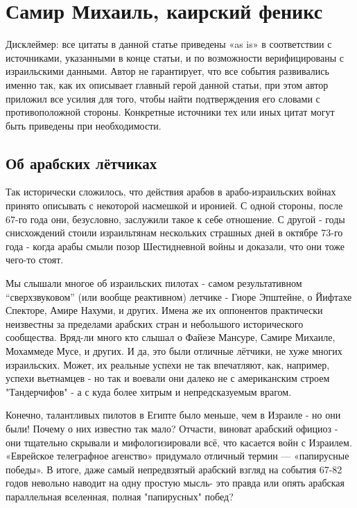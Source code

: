 \chapter{ Самир Михаиль, каирский феникс}
\begin{remark}
	Дисклеймер: все цитаты в данной статье приведены «as is» в соответствии с источниками, указанными в конце статьи, и по возможности верифицированы с израильскими данными. Автор не гарантирует, что все события развивались именно так, как их описывает главный герой данной статьи, при этом автор приложил все усилия для того, чтобы найти подтверждения его словами с противоположной стороны. Конкретные источники тех или иных цитат могут быть приведены при необходимости.
\end{remark}
\section{Об арабских лётчиках}
Так исторически сложилось, что действия арабов в арабо-израильских войнах принято описывать с некоторой насмешкой и иронией. С одной стороны, после 67-го года они, безусловно, заслужили такое к себе отношение. С другой - годы снисхождений стоили израильтянам нескольких страшных дней в октябре 73-го года - когда арабы смыли позор Шестидневной войны и доказали, что они тоже чего-то стоят.

Мы слышали многое об израильских пилотах - самом результативном “сверхзвуковом” (или вообще реактивном) летчике - Гиоре Эпштейне, о Йифтахе Спекторе, Амире Нахуми, и других. Имена же их оппонентов практически неизвестны за пределами арабских стран и небольшого исторического сообщества. Вряд-ли много кто слышал о Файезе Мансуре, Самире Михаиле, Мохаммеде Мусе, и других. И да, это были отличные лётчики, не хуже многих израильских. Может, их реальные успехи не так впечатляют, как, например, успехи вьетнамцев - но так и воевали они далеко не с американским строем "Тандерчифов" - а с куда более хитрым и непредсказуемым врагом.

Конечно, талантливых пилотов в Египте было меньше, чем в Израиле - но они были! Почему о них известно так мало? Отчасти, виноват арабский официоз - они тщательно скрывали и мифологизировали всё, что касается войн с Израилем. «Еврейское телеграфное агенство» придумало отличный термин — «папирусные победы». В итоге, даже самый непредвзятый арабский взгляд на события 67-82 годов невольно наводит на одну простую мысль- это правда или опять арабская параллельная вселенная, полная "папирусных" побед?

